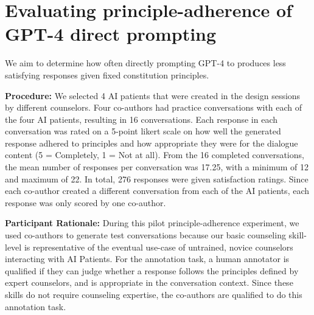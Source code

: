 \documentclass[11pt]{article}
\begin{document}
\section{Evaluating principle-adherence of GPT-4 direct prompting} \label{appendix-sec:principle-adherence-testing}

We aim to determine how often directly prompting GPT-4 to produces less satisfying responses given fixed constitution principles.


\textbf{Procedure:} We selected 4 AI patients that were created in the design sessions by different counselors. Four co-authors had practice conversations with each of the four AI patients, resulting in 16 conversations. Each response in each conversation was rated on a 5-point likert scale on how well the generated response adhered to principles and how appropriate they were for the dialogue content (5 = Completely, 1 = Not at all). From the 16 completed conversations, the mean number of responses per conversation was 17.25, with a minimum of 12 and maximum of 22. In total, 276 responses were given satisfaction ratings. Since each co-author created a different conversation from each of the AI patients, each response was only scored by one co-author.

\textbf{Participant Rationale:} During this pilot principle-adherence experiment, we used co-authors to generate test conversations because our basic counseling skill-level is representative of the eventual use-case of untrained, novice counselors interacting with AI Patients. For the annotation task, a human annotator is qualified if they can judge whether a response follows the principles defined by expert counselors, and is appropriate in the conversation context. Since these skills do not require counseling expertise, the co-authors are qualified to do this annotation task.
\end{document}
